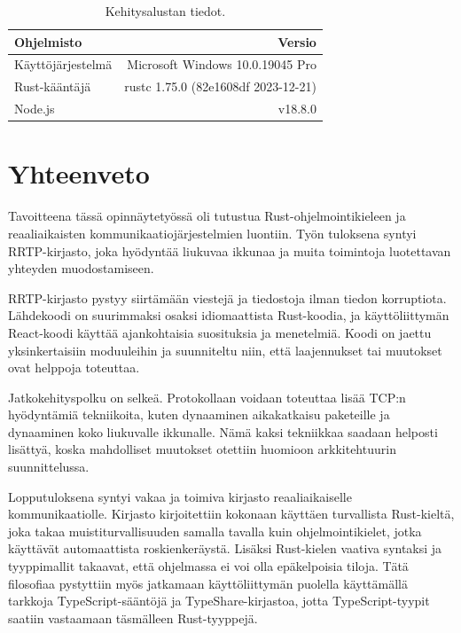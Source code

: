 \documentclass[a4paper,12pt]{article}
\begin{document}
    \begin{table}[h!]
        \centering
        \caption{Kehitysalustan tiedot.}
        \label{tab:main_pc}
        \begin{tabularx}{\textwidth}{|X|r|}
            \hline
            \textbf{Ohjelmisto} & \textbf{Versio} \\ \hline
            Käyttöjärjestelmä & Microsoft Windows 10.0.19045 Pro    \\ \hline
            Rust-kääntäjä     & rustc 1.75.0 (82e1608df 2023-12-21) \\ \hline
            Node.js           & v18.8.0 \\ \hline
        \end{tabularx}
    \end{table}

    \section{Yhteenveto}
    Tavoitteena tässä opinnäytetyössä oli tutustua Rust-ohjelmointikieleen ja
    reaaliaikaisten kommunikaatiojärjestelmien luontiin. Työn tuloksena syntyi RRTP-kirjasto, joka hyödyntää liukuvaa ikkunaa ja muita toimintoja luotettavan yhteyden muodostamiseen.\par

    RRTP-kirjasto pystyy siirtämään viestejä ja tiedostoja ilman tiedon korruptiota. Lähdekoodi on suurimmaksi osaksi idiomaattista Rust-koodia, ja käyttöliittymän React-koodi käyttää ajankohtaisia suosituksia ja menetelmiä.
    Koodi on jaettu yksinkertaisiin moduuleihin ja suunniteltu niin, että laajennukset tai muutokset ovat helppoja toteuttaa.\par

    Jatkokehityspolku on selkeä. Protokollaan voidaan toteuttaa lisää TCP:n hyödyntämiä tekniikoita, kuten dynaaminen aikakatkaisu paketeille ja dynaaminen koko liukuvalle ikkunalle. Nämä kaksi tekniikkaa saadaan helposti lisättyä, koska mahdolliset muutokset otettiin huomioon arkkitehtuurin suunnittelussa.\par

    Lopputuloksena syntyi vakaa ja toimiva kirjasto reaaliaikaiselle kommunikaatiolle. Kirjasto kirjoitettiin kokonaan käyttäen turvallista Rust-kieltä, joka takaa muistiturvallisuuden samalla tavalla kuin ohjelmointikielet, jotka käyttävät automaattista roskienkeräystä. Lisäksi Rust-kielen vaativa syntaksi ja
    tyyppimallit takaavat, että ohjelmassa ei voi olla epäkelpoisia tiloja.
    Tätä filosofiaa pystyttiin myös jatkamaan käyttöliittymän puolella käyttämällä
    tarkkoja TypeScript-sääntöjä ja TypeShare-kirjastoa, jotta TypeScript-tyypit saatiin vastaamaan täsmälleen Rust-tyyppejä.\par
\end{document}
